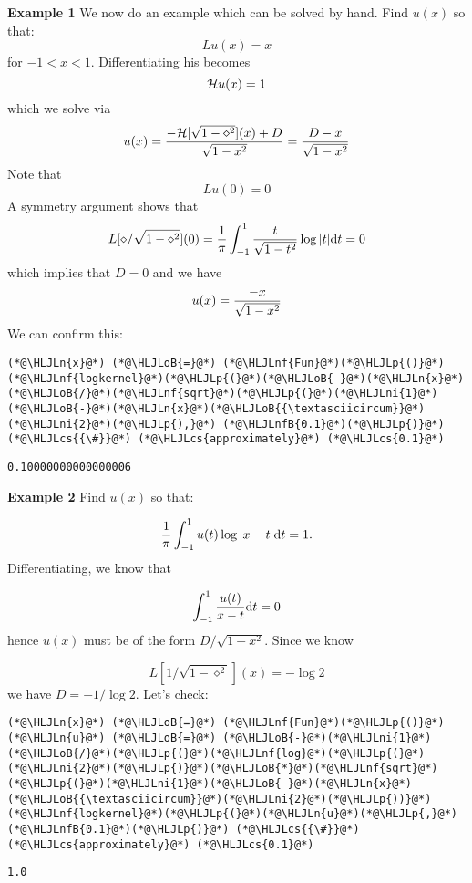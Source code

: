 \documentclass[12pt,landscape]{article}
\newcommand{\HLJLn}[1]{#1}
\newcommand{\HLJLnf}[1]{\textcolor[RGB]{66,102,213}{#1}}
\newcommand{\HLJLnfB}[1]{\textcolor[RGB]{59,151,46}{#1}}
\newcommand{\HLJLni}[1]{\textcolor[RGB]{59,151,46}{#1}}
\newcommand{\HLJLoB}[1]{\textcolor[RGB]{102,102,102}{\textbf{#1}}}
\newcommand{\HLJLp}[1]{#1}
\newcommand{\HLJLcs}[1]{\textcolor[RGB]{153,153,119}{\textit{#1}}}
\def\D{ {\rm d} }
\def\HH{ {\cal H} }
\def\dt{\D t}
\begin{document}
{\textbf{Example 1} We now do an example which can be solved by hand. Find $u(x)$ so that:
\[
L u(x) = x
\]
for $-1 < x < 1$. Differentiating his becomes
\[
\HH u(x) = 1
\]
which we solve via
\[
u(x) = {- \HH[\sqrt{1-\diamond^2}](x) + D \over \sqrt{1-x^2}} = {D-x \over \sqrt{1-x^2}}
\]
Note that
\[
L u(0) = 0
\]
A symmetry argument shows that
\[
L [\diamond/\sqrt{1-\diamond^2}](0) = {1 \over \pi} \int_{-1}^1 {t \over \sqrt{1-t^2}} \log|t| \D t = 0
\]
which implies that $D = 0$ and we have
\[
u(x) = {-x \over \sqrt{1-x^2}}
\]
We can confirm this:
\begin{lstlisting}
(*@\HLJLn{x}@*) (*@\HLJLoB{=}@*) (*@\HLJLnf{Fun}@*)(*@\HLJLp{()}@*)
(*@\HLJLnf{logkernel}@*)(*@\HLJLp{(}@*)(*@\HLJLoB{-}@*)(*@\HLJLn{x}@*)(*@\HLJLoB{/}@*)(*@\HLJLnf{sqrt}@*)(*@\HLJLp{(}@*)(*@\HLJLni{1}@*)(*@\HLJLoB{-}@*)(*@\HLJLn{x}@*)(*@\HLJLoB{{\textasciicircum}}@*)(*@\HLJLni{2}@*)(*@\HLJLp{),}@*) (*@\HLJLnfB{0.1}@*)(*@\HLJLp{)}@*) (*@\HLJLcs{{\#}}@*) (*@\HLJLcs{approximately}@*) (*@\HLJLcs{0.1}@*)
\end{lstlisting}

\begin{lstlisting}
0.10000000000000006
\end{lstlisting}


\textbf{Example 2} Find $u(x)$ so that:

\[
{1 \over \pi} \int_{-1}^1 u(t) \log | x-t| \dt = 1.
\]
Differentiating, we know that

\[
\int_{-1}^1 {u(t) \over x-t} \dt = 0
\]
hence $u(x)$ must be of the form ${D / \sqrt{1-x^2}}$.  Since we know

\[
L[{1 /\sqrt{1-\diamond^2}}](x) = - \log 2
\]
we have $D = -1/\log 2$. Let's check:


\begin{lstlisting}
(*@\HLJLn{x}@*) (*@\HLJLoB{=}@*) (*@\HLJLnf{Fun}@*)(*@\HLJLp{()}@*)
(*@\HLJLn{u}@*) (*@\HLJLoB{=}@*) (*@\HLJLoB{-}@*)(*@\HLJLni{1}@*)(*@\HLJLoB{/}@*)(*@\HLJLp{(}@*)(*@\HLJLnf{log}@*)(*@\HLJLp{(}@*)(*@\HLJLni{2}@*)(*@\HLJLp{)}@*)(*@\HLJLoB{*}@*)(*@\HLJLnf{sqrt}@*)(*@\HLJLp{(}@*)(*@\HLJLni{1}@*)(*@\HLJLoB{-}@*)(*@\HLJLn{x}@*)(*@\HLJLoB{{\textasciicircum}}@*)(*@\HLJLni{2}@*)(*@\HLJLp{))}@*)
(*@\HLJLnf{logkernel}@*)(*@\HLJLp{(}@*)(*@\HLJLn{u}@*)(*@\HLJLp{,}@*) (*@\HLJLnfB{0.1}@*)(*@\HLJLp{)}@*) (*@\HLJLcs{{\#}}@*) (*@\HLJLcs{approximately}@*) (*@\HLJLcs{0.1}@*)
\end{lstlisting}

\begin{lstlisting}
1.0
\end{lstlisting}


}
\end{document}
